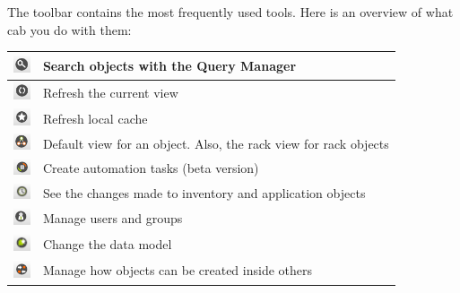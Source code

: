 \documentclass[a4paper]{article}
\begin{document}
	The toolbar contains the most frequently used tools. Here is an overview of what cab you do with them:
	\begin{table}[h!]
		\centering
		\begin{tabular}{cl}
			\includegraphics[width=0.5cm]{img/icon_query_manager.png} & Search objects with the Query Manager\\
			\midrule
			\includegraphics[width=0.5cm]{img/icon_refresh_component.png} & Refresh the current view\\
			\midrule
			\includegraphics[width=0.5cm]{img/icon_refresh_cache.png} & Refresh local cache\\
			\midrule
			\includegraphics[width=0.5cm]{img/icon_object_view.png} & Default view for an object. Also, the rack view for rack objects\\
			\midrule
			\includegraphics[width=0.5cm]{img/icon_task_manager.png} & Create automation tasks (beta version)\\
			\midrule
			\includegraphics[width=0.5cm]{img/icon_audit_trail.png} & See the changes made to inventory and application objects\\
			\midrule
			\includegraphics[width=0.5cm]{img/icon_user_manager.png} & Manage users and groups\\
			\midrule
			\includegraphics[width=0.5cm]{img/icon_data_model_manager.png} & Change the data model\\
			\midrule
			\includegraphics[width=0.5cm]{img/icon_containment_manager.png} & Manage how objects can be created inside others\\

\end{tabular}
\end{table}
\end{document}
